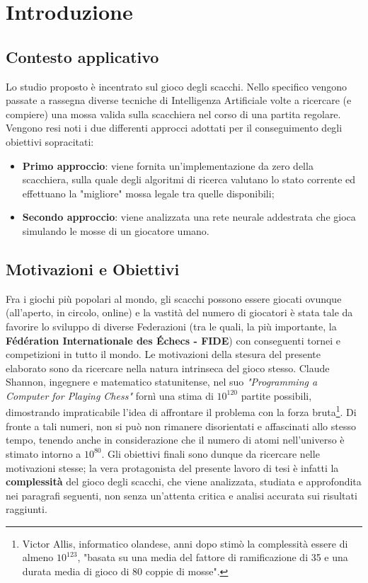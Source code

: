 \chapter{Introduzione}
\section{Contesto applicativo}
Lo studio proposto è incentrato sul gioco degli scacchi. Nello specifico vengono passate a rassegna diverse tecniche di 
Intelligenza Artificiale volte a ricercare (e compiere) una mossa valida sulla scacchiera nel corso di una partita regolare.
Vengono resi noti i due differenti approcci adottati per il conseguimento degli obiettivi sopracitati: 
\begin{itemize}
    \item \textbf{Primo approccio}: viene fornita un'implementazione da zero della scacchiera, sulla quale degli algoritmi di ricerca valutano lo stato corrente ed effettuano la "migliore"
    mossa legale tra quelle disponibili;
    \item \textbf{Secondo approccio}: viene analizzata una rete neurale addestrata che gioca simulando le mosse di un giocatore umano. 
\end{itemize}

\section{Motivazioni e Obiettivi} %
Fra i giochi più popolari al mondo, gli scacchi possono essere giocati ovunque (all'aperto, in circolo, online) e la vastità del numero di 
giocatori è stata tale da favorire lo sviluppo di diverse Federazioni (tra le quali, la più importante, la 
\textbf{Fédération Internationale des Échecs - FIDE}) con conseguenti tornei e competizioni in tutto il mondo. 
Le motivazioni della stesura del presente elaborato sono da ricercare nella natura intrinseca del gioco stesso. 
Claude Shannon, ingegnere e matematico statunitense, nel suo \textit{"Programming a Computer for Playing Chess"} fornì una stima di $10^{120}$
partite possibili, dimostrando impraticabile l'idea di affrontare il problema con la forza bruta\footnote{Victor Allis, informatico olandese, 
anni dopo stimò la complessità essere di almeno $10^{123}$, "basata su una media del fattore di ramificazione di 35 e una 
durata media di gioco di 80 coppie di mosse".}. Di fronte a tali numeri, non si può non rimanere disorientati e affascinati allo
stesso tempo, tenendo anche in considerazione che il numero di atomi nell'universo è stimato intorno a $10^{80}$. 
Gli obiettivi finali sono dunque da ricercare nelle motivazioni stesse; la vera protagonista del
presente lavoro di tesi è infatti la \textbf{complessità} del gioco degli scacchi, che viene analizzata, studiata e approfondita nei paragrafi
seguenti, non senza un'attenta critica e analisi accurata sui risultati raggiunti.

